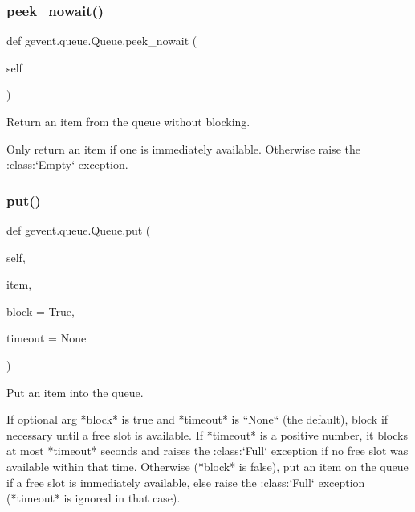 \subsubsection{\texorpdfstring{peek\+\_\+nowait()}{peek\_nowait()}}
{\footnotesize\ttfamily def gevent.\+queue.\+Queue.\+peek\+\_\+nowait (\begin{DoxyParamCaption}\item[{}]{self }\end{DoxyParamCaption})}

\begin{DoxyVerb}Return an item from the queue without blocking.

Only return an item if one is immediately available. Otherwise
raise the :class:`Empty` exception.
\end{DoxyVerb}
 \mbox{\label{classgevent_1_1queue_1_1_queue_a75f86f125b819bd44599d45e826d9eed}} 
\subsubsection{\texorpdfstring{put()}{put()}}
{\footnotesize\ttfamily def gevent.\+queue.\+Queue.\+put (\begin{DoxyParamCaption}\item[{}]{self,  }\item[{}]{item,  }\item[{}]{block = {\ttfamily True},  }\item[{}]{timeout = {\ttfamily None} }\end{DoxyParamCaption})}

\begin{DoxyVerb}Put an item into the queue.

If optional arg *block* is true and *timeout* is ``None`` (the default),
block if necessary until a free slot is available. If *timeout* is
a positive number, it blocks at most *timeout* seconds and raises
the :class:`Full` exception if no free slot was available within that time.
Otherwise (*block* is false), put an item on the queue if a free slot
is immediately available, else raise the :class:`Full` exception (*timeout*
is ignored in that case).
\end{DoxyVerb}
 \mbox{\label{classgevent_1_1queue_1_1_queue_a0b820188057f94b37752fff18e6b21b8}} 
